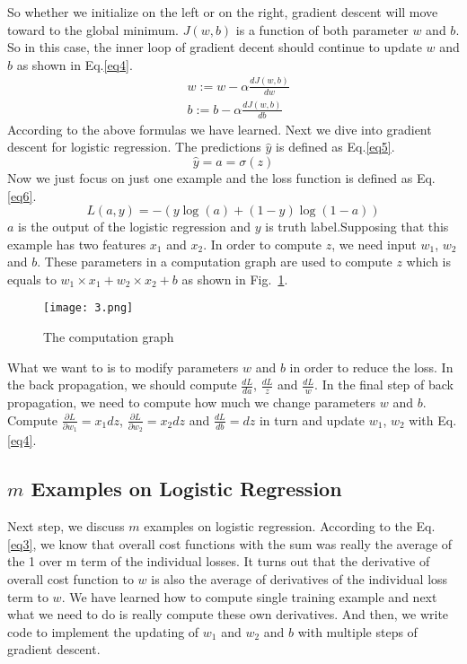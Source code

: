 \documentclass[a4paper]{article}
\begin{document}
So whether we initialize on the 
left or on the right, gradient descent will move toward to the global 
minimum. $J\left(w,b\right)$ is a function of both parameter $w$ and $b$. 
So in this case, the inner loop of gradient decent should continue to update
$w$ and $b$ as shown in Eq.\ref{eq4}.
%
\begin{equation}
\begin{aligned}
 &w:= w - \alpha \frac{dJ\left(w,b\right)}{dw} \\
 &b:= b - \alpha \frac{dJ\left(w,b\right)}{db}
\end{aligned}
\label{eq4}
\end{equation}
%
According to the above formulas we have learned. Next we dive into 
gradient descent for logistic regression. The predictions $\hat{y}$ 
is defined as Eq.\ref{eq5}.
\begin{equation}
\hat{y}=a=\sigma\left(z\right)
\label{eq5}
\end{equation}
Now we just focus on just one example and the loss function is 
defined as Eq.\ref{eq6}.
\begin{equation}
 L\left(a,y\right) = -\left(y\log\left(a\right)+\left(1-y\right)\log\left(1-a\right)\right)
 \label{eq6}
\end{equation}
$a$ is the output of the logistic regression and $y$ is truth 
label.Supposing that this example has two features $x_1$ and 
$x_2$. In order to compute $z$, we need input $w_1$, $w_2$ and
$b$. These parameters in a computation graph are used to compute
$z$ which is equals to $w_1\times x_1+w_2\times x_2 +b$ as 
shown in Fig.~\ref{fig3}.
\begin{figure}[htbp]
	\centering
	\texttt{[image: 3.png]}
	\caption{The computation graph}
	\label{fig3}
\end{figure}
What we want to is to modify parameters $w$ and $b$ in order to 
reduce the loss. In the back propagation, we should compute 
$\frac{dL}{da}$, $\frac{dL}{z}$ and $\frac{dL}{w}$. In the final step
of back propagation, we need to compute how much we change parameters
$w$ and $b$. Compute $\frac{\partial L}{\partial w_1}=x_1 dz$, $\frac{\partial L}{\partial w_2}=x_2 dz$ and $\frac{dL}{db }=dz$ in turn and
update $w_1$, $w_2$ with Eq.\ref{eq4}.
\subsection{$m$ Examples on Logistic Regression}
Next step, we discuss $m$ examples on logistic regression. According to the
Eq.\ref{eq3}, we know that overall cost functions with the sum was 
really the average of the 1 over m term of the individual losses. 
It turns out that the derivative of overall cost function to $w$ is 
also the average of derivatives of the individual loss term to $w$. 
We have learned how to compute single training example and next what 
we need to do is really compute these own derivatives. And then, we
write code to implement the updating of $w_1$ and $w_2$ and $b$ 
with multiple steps of gradient descent.
\end{document}
